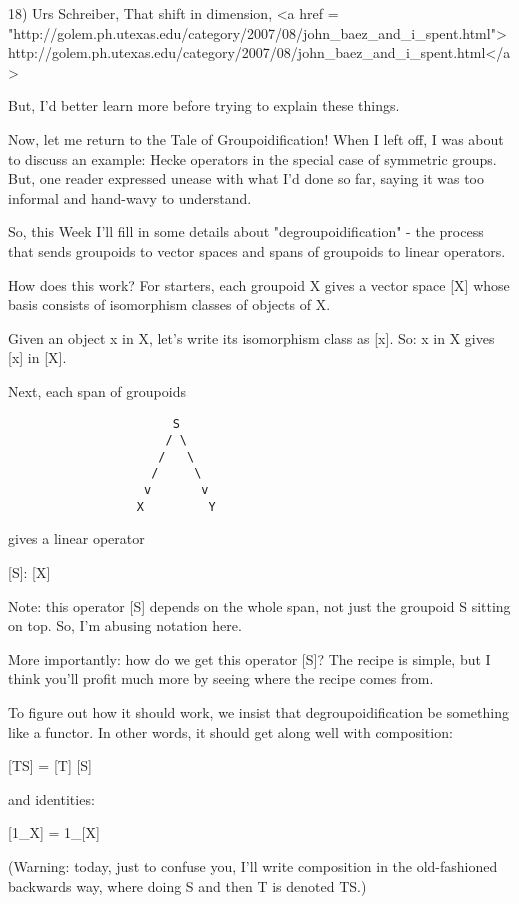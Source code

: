 18) Urs Schreiber, That shift in dimension,
<a href = "http://golem.ph.utexas.edu/category/2007/08/john_baez_and_i_spent.html">http://golem.ph.utexas.edu/category/2007/08/john_baez_and_i_spent.html</a>

But, I'd better learn more before trying to explain these things.

Now, let me return to the Tale of Groupoidification!  When I left
off, I was about to discuss an example: Hecke operators in the 
special case of symmetric groups.  But, one reader expressed 
unease with what I'd done so far, saying it was too informal and 
hand-wavy to understand.  

So, this Week I'll fill in some details about "degroupoidification" - 
the process that sends groupoids to vector spaces and spans of 
groupoids to linear operators.  

How does this work?  For starters, each groupoid X gives a vector 
space [X] whose basis consists of isomorphism classes of objects 
of X.   

Given an object x in X, let's write its isomorphism class 
as [x].  So: x in X gives [x] in [X].

Next, each span of groupoids 

\begin{verbatim}
                       S
                      / \
                     /   \
                    /     \
                   v       v
                  X         Y
\end{verbatim}
    

gives a linear operator 

[S]: [X] \to  [Y]

Note: this operator [S] depends on the whole span, not just the
groupoid S sitting on top.  So, I'm abusing notation here.

More importantly: how do we get this operator [S]?  The recipe is
simple, but I think you'll profit much more by seeing where the 
recipe comes from.

To figure out how it should work, we insist that degroupoidification 
be something like a functor.  In other words, it should get along 
well with composition:

[TS] = [T] [S]

and identities:

[1_{X}] = 1_{[X]}

(Warning: today, just to confuse you, I'll write composition in 
the old-fashioned backwards way, where doing S and then T is 
denoted TS.)

